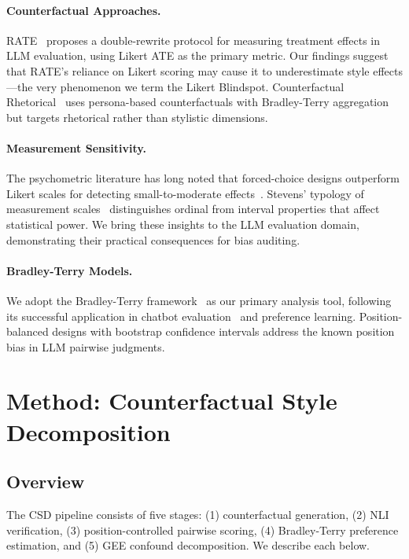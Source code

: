 \documentclass[11pt,a4paper]{article}
\begin{document}
\paragraph{Counterfactual Approaches.}
RATE~\cite{chen2025rate} proposes a double-rewrite protocol for measuring treatment effects in LLM evaluation, using Likert ATE as the primary metric. Our findings suggest that RATE's reliance on Likert scoring may cause it to underestimate style effects---the very phenomenon we term the Likert Blindspot. Counterfactual Rhetorical~\cite{zhou2025counterfactual} uses persona-based counterfactuals with Bradley-Terry aggregation but targets rhetorical rather than stylistic dimensions.

\paragraph{Measurement Sensitivity.}
The psychometric literature has long noted that forced-choice designs outperform Likert scales for detecting small-to-moderate effects~\cite{decoster2011best,feinstein1990high}. Stevens' typology of measurement scales~\cite{stevens1946theory} distinguishes ordinal from interval properties that affect statistical power. We bring these insights to the LLM evaluation domain, demonstrating their practical consequences for bias auditing.

\paragraph{Bradley-Terry Models.}
We adopt the Bradley-Terry framework~\cite{bradley1952rank} as our primary analysis tool, following its successful application in chatbot evaluation~\cite{zheng2024judging} and preference learning. Position-balanced designs with bootstrap confidence intervals address the known position bias in LLM pairwise judgments.

\section{Method: Counterfactual Style Decomposition}

\subsection{Overview}

The CSD pipeline consists of five stages: (1) counterfactual generation, (2) NLI verification, (3) position-controlled pairwise scoring, (4) Bradley-Terry preference estimation, and (5) GEE confound decomposition. We describe each below.
\end{document}
